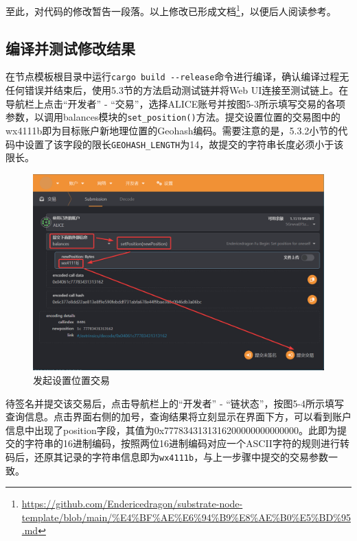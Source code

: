 至此，对代码的修改暂告一段落。以上修改已形成文档\footnote{\url{https://github.com/Endericedragon/substrate-node-template/blob/main/\%E4\%BF\%AE\%E6\%94\%B9\%E8\%AE\%B0\%E5\%BD\%95.md}}，以便后人阅读参考。

\subsection{编译并测试修改结果}

在节点模板根目录中运行\verb|cargo build --release|命令进行编译，确认编译过程无任何错误并结束后，使用5.3节的方法启动测试链并将Web UI连接至测试链上。在导航栏上点击“开发者” - “交易”，选择ALICE账号并按图5-3所示填写交易的各项参数，以调用balances模块的\verb|set_position()|方法。提交设置位置的交易图中的wx4111b即为目标账户新地理位置的Geohash编码。需要注意的是，5.3.2小节的代码中设置了该字段的限长\verb|GEOHASH_LENGTH|为14，故提交的字符串长度必须小于该限长。

\begin{figure}[htbp]
    \centering
    \includegraphics[width=\textwidth]{images/setPos.png}
    \caption{发起设置位置交易}\label{发起设置位置交易} %
\end{figure}

待签名并提交该交易后，点击导航栏上的“开发者” - “链状态”，按图5-4所示填写查询信息。点击界面右侧的加号，查询结果将立刻显示在界面下方，可以看到账户信息中出现了position字段，其值为0x7778343131316200000000000000。此即为提交的字符串的16进制编码，按照两位16进制编码对应一个ASCII字符的规则进行转码后，还原其记录的字符串信息即为\verb|wx4111b|，与上一步骤中提交的交易参数一致。

